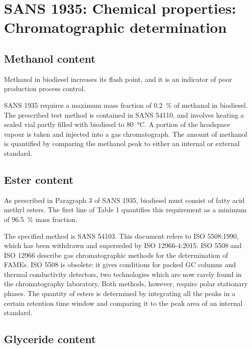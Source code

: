 \section{SANS 1935: Chemical properties: Chromatographic determination}
\label{sec:ChromDet}

\subsection{Methanol content}

Methanol in biodiesel increases its flash point, and it is an indicator of poor
production process control.

SANS 1935 requires a maximum mass fraction of \SI{0.2}{\percent} of methanol in
biodiesel. The prescribed test method is contained in SANS 54110, and involves
heating a sealed vial partly filled with biodiesel to \SI{80}{\celsius}. A
portion of the headspace vapour is taken and injected into a gas chromatograph.
The amount of methanol is quantified by comparing the methanol peak to either an
internal or external standard.

\subsection{Ester content}
\label{sec:EsterContent}
As prescribed in Paragraph 3 of SANS 1935, biodiesel must consist of fatty acid
methyl esters. The first line of Table 1 quantifies this requirement as a
minimum of \SI{96.5}{\percent} mass fraction. 

The specified method is SANS 54103. This document refers to ISO 5508:1990, which
has been withdrawn and superseded by ISO 12966-4:2015. ISO 5508 and ISO 12966
describe gas chromatographic methods for the determination of FAMEs. ISO 5508 is
obsolete: it gives conditions for packed GC columns and thermal conductivity
detectors, two technologies which are now rarely found in the chromatography
laboratory. Both methods, however, require polar stationary phases. The quantity of
esters is determined by integrating all the peaks in a certain retention time
window and comparing it to the peak area of an internal standard.

\subsection{Glyceride content}
\label{sec:Glycerides}


